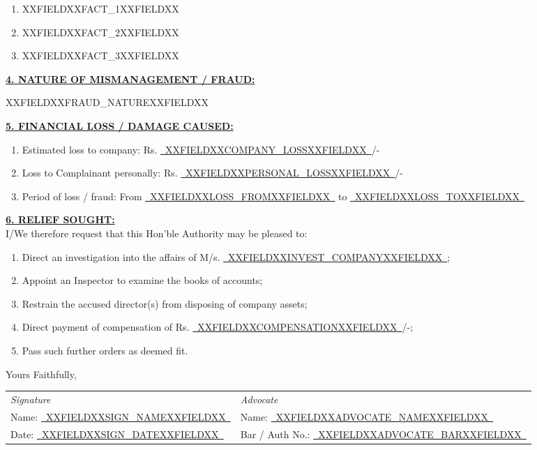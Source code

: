 \documentclass[12pt,a4paper]{article}
\newcommand{\fillline}[1]{\underline{~#1~}}
\begin{document}
\vspace{0.5em}
\begin{enumerate}[label=(\alph*)]
    \item XXFIELDXXFACT_1XXFIELDXX
    \item XXFIELDXXFACT_2XXFIELDXX
    \item XXFIELDXXFACT_3XXFIELDXX
\end{enumerate}

\vspace{1em}

\noindent\textbf{\uline{4. NATURE OF MISMANAGEMENT / FRAUD:}}

\vspace{0.3em}
\noindent XXFIELDXXFRAUD_NATUREXXFIELDXX

\vspace{1em}

\noindent\textbf{\uline{5. FINANCIAL LOSS / DAMAGE CAUSED:}}
\begin{enumerate}[label=(\alph*)]
    \item Estimated loss to company: Rs. \fillline{XXFIELDXXCOMPANY_LOSSXXFIELDXX}/-
    \item Loss to Complainant personally: Rs. \fillline{XXFIELDXXPERSONAL_LOSSXXFIELDXX}/-
    \item Period of loss / fraud: From \fillline{XXFIELDXXLOSS_FROMXXFIELDXX} to \fillline{XXFIELDXXLOSS_TOXXFIELDXX}
\end{enumerate}

\vspace{1em}

\noindent\textbf{\uline{6. RELIEF SOUGHT:}}\\
I/We therefore request that this Hon'ble Authority may be pleased to:
\begin{enumerate}[label=(\alph*)]
    \item Direct an investigation into the affairs of M/s. \fillline{XXFIELDXXINVEST_COMPANYXXFIELDXX};
    \item Appoint an Inspector to examine the books of accounts;
    \item Restrain the accused director(s) from disposing of company assets;
    \item Direct payment of compensation of Rs. \fillline{XXFIELDXXCOMPENSATIONXXFIELDXX}/-;
    \item Pass such further orders as deemed fit.
\end{enumerate}

\vspace{1.5em}

\noindent Yours Faithfully,

\vspace{2em}

\noindent
\begin{tabularx}{\textwidth}{@{}X X@{}}
    \textit{Signature} & \textit{Advocate}\\[1.5em]
    Name: \fillline{XXFIELDXXSIGN_NAMEXXFIELDXX} & Name: \fillline{XXFIELDXXADVOCATE_NAMEXXFIELDXX}\\[0.5em]
    Date: \fillline{XXFIELDXXSIGN_DATEXXFIELDXX} & Bar / Auth No.: \fillline{XXFIELDXXADVOCATE_BARXXFIELDXX}\\
\end{tabularx}
\end{document}
